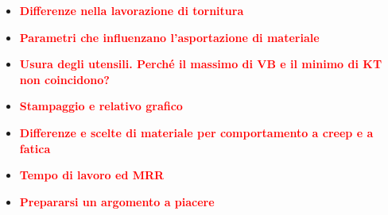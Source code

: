 \documentclass[a4paper, 15pt]{article}
\begin{document}
\begin{itemize}
				
				
\item
				\textcolor{red}{\textbf{Differenze nella lavorazione di tornitura}}\\
					
					
					
					
					
\item
					\textcolor{red}{\textbf{Parametri che influenzano l'asportazione di materiale}}\\
						
						
						
						
						
\item
\textcolor{red}{\textbf{Usura degli utensili. Perché il massimo di VB e il minimo di KT non coincidono?}}\\

\item 
\textcolor{red}{\textbf{Stampaggio e relativo grafico}}\\

\item 
\textcolor{red}{\textbf{Differenze e scelte di materiale per comportamento a creep e a fatica}}\\		

\item 
\textcolor{red}{\textbf{Tempo di lavoro ed MRR}}\\	

\item 
\textcolor{red}{\textbf{Prepararsi un argomento a piacere}}\\							
							
			
\end{itemize}				
\end{document}
